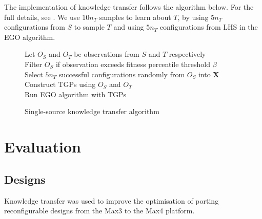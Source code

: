 \documentclass[10pt,a4paper]{article}
\begin{document}
The implementation of knowledge transfer follows the algorithm below. For the full details, see . We use $10n_T$ samples\cite{Jones1998} to learn about $T$, by using $5n_T$ configurations from $S$ to sample $T$ and using $5n_T$ configurations from LHS in the EGO algorithm. 
\begin{figure}[H]
	\begin{framed}
		\begin{algorithm}[H]
			Let $O_S$ and $O_T$ be observations from $S$ and $T$ respectively\\
			Filter $O_S$ if observation exceeds fitness percentile threshold $\beta$\\
			Select $5n_T$ successful configurations randomly from $O_S$ into $\mathbf{X}$\\
			Construct TGPs using $O_S$ and $O_T$\\
			Run EGO algorithm with TGPs
		\end{algorithm}		
	\end{framed}
	\caption{Single-source knowledge transfer algorithm}
\end{figure}

\section{Evaluation}

\subsection{Designs}

Knowledge transfer was used to improve the optimisation of porting reconfigurable designs from the Max3 to the Max4 platform.
\end{document}
